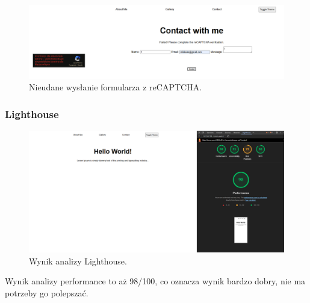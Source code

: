 \documentclass[a4paper,12pt]{article}
\begin{document}
\begin{figure}[H]
    \centering
    \includegraphics[width=1\textwidth]{images/contact_failure.png}
    \caption{Nieudane wysłanie formularza z reCAPTCHA.}
\end{figure}

\subsubsection{Lighthouse}

\begin{figure}[H]
    \centering
    \includegraphics[width=1\textwidth]{images/lighthouse.png}
    \caption{Wynik analizy Lighthouse.}
\end{figure}

Wynik analizy performance to aż 98/100, co oznacza wynik bardzo dobry, nie ma potrzeby go polepszać.
\end{document}
